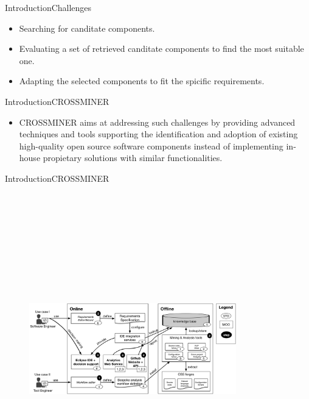 \documentclass{beamer}
\begin{document}
\begin{frame}{Introduction}{Challenges}

\begin{itemize}
	\item Searching for canditate components.
	\item Evaluating a set of retrieved canditate components to find the most suitable one.
	\item Adapting the selected components to fit the spicific requirements.
\end{itemize}

\end{frame}

\begin{frame}{Introduction}{CROSSMINER}
\begin{itemize}
	\item CROSSMINER aims at addressing such challenges by providing
	advanced techniques and tools supporting the identification
	and adoption of existing high-quality open source software 
	components instead of implementing in-house propietary solutions
	with similar functionalities.
\end{itemize}

\end{frame}

\begin{frame}{Introduction}{CROSSMINER}
	\begin{figure}[!h]
	\includegraphics[width=9cm,height=13.5cm,keepaspectratio]{images/crossminer.png}
	\centering
	\label{fig:Crossminer}
	\end{figure}
\end{frame}
\end{document}
